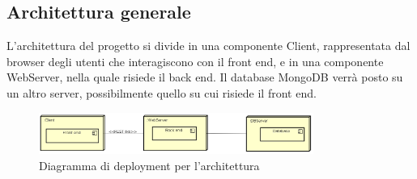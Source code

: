 \subsection{Architettura generale}
L'architettura del progetto si divide in una componente Client, rappresentata dal browser degli utenti che interagiscono con il front end, e in una componente WebServer, nella quale risiede il back end. Il database MongoDB verrà posto su un altro server, possibilmente quello su cui risiede il front end. \\
\begin{figure}[h]
\centering
\includegraphics[width=0.8\textwidth]{res/sections/GeneralArchitecture.png}
\caption{Diagramma di deployment per l'architettura}
\end{figure}

